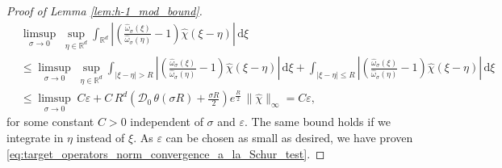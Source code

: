 \documentclass[reqno, 11pt]{amsart}
\numberwithin{equation}{section}
\theoremstyle{definition}
\begin{document}
\begin{proof}[Proof of Lemma \ref{lem:h-1_mod_bound}]
\begin{align*}
        &\limsup_{\sigma\rightarrow 0}\;\sup_{\eta\in\mathbb{R}^d}\int_{\mathbb{R}^{d}}\left|\left(\frac{\hat{\omega}_\sigma(\xi)}{\hat{\omega}_\sigma(\eta)}-1\right)\hat{\chi}(\xi-\eta)\right|\,\mathrm{d} \xi\\
        &\leq \limsup_{\sigma\rightarrow 0}\;\sup_{\eta\in\mathbb{R}^d}\int_{|\xi-\eta|>R}\left|\left(\frac{\hat{\omega}_\sigma(\xi)}{\hat{\omega}_\sigma(\eta)}-1\right)\hat{\chi}(\xi-\eta)\right|\,\mathrm{d} \xi
        +\int_{|\xi-\eta|\leq R}\left|\left(\frac{\hat{\omega}_\sigma(\xi)}{\hat{\omega}_\sigma(\eta)}-1\right)\hat{\chi}(\xi-\eta)\right|\,\mathrm{d} \xi\\
        &\leq \limsup_{\sigma\rightarrow 0}\;C\varepsilon+C\,R^d\left(\mathcal{D}_0\,\theta(\sigma R)+\frac{\sigma R}{2}\right)e^{\frac{R}{2}}\,\|\hat{\chi}\|_\infty
        =C\varepsilon,
    \end{align*}
    for some constant $C>0$ independent of $\sigma$ and $\varepsilon$. The same bound holds if we integrate in $\eta$ instead of $\xi$. As $\varepsilon$ can be chosen as small as desired, we have proven \eqref{eq:target_operators_norm_convergence_a_la_Schur_test}.
\end{proof}
\end{document}
